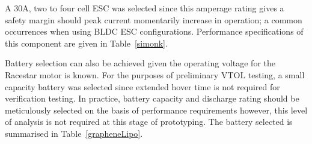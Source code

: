  A 30A, two to four cell ESC was selected since this amperage rating gives a safety margin should peak current momentarily increase in operation; a common occurrences when using BLDC ESC configurations. Performance specifications of this component are given in Table~\ref{simonk}.
 \begin{table}[H]
 \caption{Simonk 30A ESC Specifications}
 \label{simonk}
\end{table}

Battery selection can also be achieved given the operating voltage for the Racestar motor is known. For the purposes of preliminary VTOL testing, a small capacity battery was selected since extended hover time is not required for verification testing. In practice, battery capacity and discharge rating should be meticulously selected on the basis of performance requirements however, this level of analysis is not required at this stage of prototyping. The battery selected is summarised in Table~\ref{grapheneLipo}.

\begin{table}[H]
\caption{Turnigy Graphene Battery Specifications}
\label{grapheneLipo}
\end{table}

